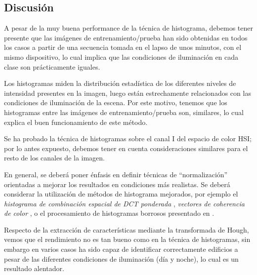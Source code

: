 \documentclass[conference,a4paper,10pt,oneside,final]{tfmpd}
\begin{document}
\subsection{Discusión}


A pesar de la muy buena performance de la técnica de histograma, debemos tener
presente que las  imágenes de entrenamiento/prueba han sido obtenidas
en todos los casos a partir de una secuencia tomada en el 
lapso de unos minutos, con el mismo dispositivo, lo cual implica que las
condiciones de iluminación en cada clase son prácticamente iguales.

Los histogramas miden la distribución estadística de los diferentes niveles
de intensidad presentes en la imagen, luego están estrechamente relacionados
con las condiciones de iluminación de la escena. Por este motivo, tenemos
que los histogramas entre las imágenes de entrenamiento/prueba son,  similares, lo cual explica el buen funcionamiento de este
método.

Se ha probado la técnica de histogramas sobre el canal I del espacio de color
HSI; por lo antes expuesto, debemos tener en cuenta consideraciones similares
para el resto de los canales de la imagen.

En general, se deberá poner énfasis en definir técnicas
de ``normalización'' orientadas a mejorar los resultados en condiciones más
realistas. Se deberá considerar la utilización de métodos de histograma
mejorados, por ejemplo el \emph{histograma de combinación espacial de DCT
ponderada} \cite{wdctsch}, \emph{vectores de coherencia de
color} \cite{Pass96histogramrefinement}, o el procesamiento de
histogramas borrosos presentado en \cite{Konstantinidis2005375}.

Respecto de la extracción de características mediante la transformada de Hough,
vemos que el rendimiento no es tan bueno como en la técnica de histogramas,
sin embargo en varios casos ha sido capaz de identificar correctamente edificios
a pesar de las diferentes condiciones de iluminación (día y noche), lo cual
es un resultado alentador.
\end{document}
